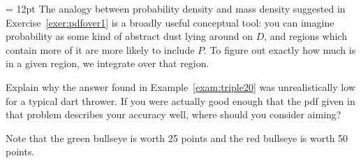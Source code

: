 \documentclass[prettycode,shellescape]{watsonbook}
\begin{document}
\begin{minipage}[t]{0.55\textwidth} \parskip = 12pt 
  The analogy between probability density and mass density suggested
  in Exercise~\ref{exer:pdfover1} is a broadly useful conceptual tool:
  you can imagine probability as some kind of abstract dust lying around
  on $D$, and regions which contain more of it are more likely to
  include $P$. To figure out exactly how much is in a given region, we
  integrate over that region. 

  \begin{exercise}{}{}
    Explain why the answer found in Example~\ref{exam:triple20} was
    unrealistically low for a typical dart thrower. If you were
    actually good enough that the pdf given in that problem describes
    your accuracy well, where should you consider aiming?

    Note that the green bullseye is worth 25 points and the red
    bullseye is worth 50 points.
  \end{exercise}
\end{minipage} \hfill
\end{document}
